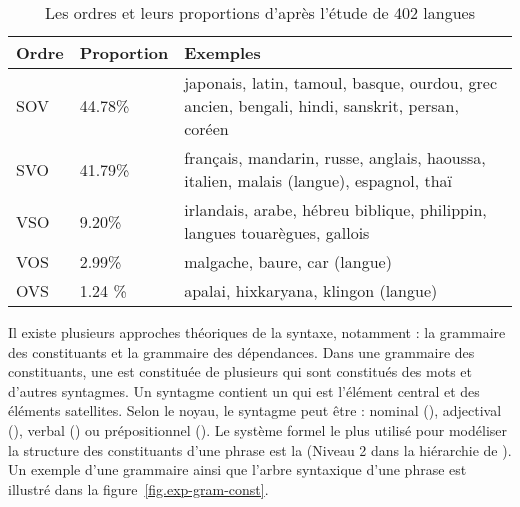 \documentclass{KodeBook}
\begin{document}
\begin{table}[ht]
	\centering
	\begin{tabular}{p{}p{}p{}}
		\hline\hline 
		\textbf{Ordre} & \textbf{Proportion} & \textbf{Exemples} \\
		\hline
		SOV & 44.78\% & japonais, latin, tamoul, basque, ourdou, grec ancien, bengali, hindi, sanskrit, persan, coréen \\
		SVO & 41.79\% & français, mandarin, russe, anglais, haoussa, italien, malais (langue), espagnol, thaï \\
		VSO & 9.20\% & irlandais, arabe, hébreu biblique, philippin, langues touarègues, gallois \\
		VOS & 2.99\% & malgache, baure, car (langue) \\
		OVS & 1.24 \% & apalai, hixkaryana, klingon (langue) \\
		\hline\hline
	\end{tabular}
	\caption{Les ordres et leurs proportions d'après l'étude de 402 langues \cite{1988-blake} \label{tab:ordre}}
\end{table}

Il existe plusieurs approches théoriques de la syntaxe, notamment : la grammaire des constituants et la grammaire des dépendances. 
Dans une grammaire des constituants, une   est constituée de plusieurs  qui sont constitués des mots et d'autres syntagmes.
Un syntagme contient un  qui est l'élément central et des éléments satellites.
Selon le noyau, le syntagme peut être : nominal (), adjectival (), verbal () ou prépositionnel ().
Le système formel le plus utilisé pour modéliser la structure des constituants d'une phrase est la  (Niveau 2 dans la hiérarchie de ).
Un exemple d'une grammaire ainsi que l'arbre syntaxique d'une phrase est illustré dans la figure~\ref{fig.exp-gram-const}.
\end{document}
